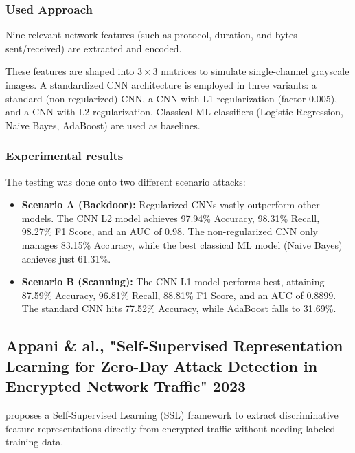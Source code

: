 \documentclass[12pt, a4paper]{report}
\begin{document}
\subsubsection{Used Approach }
Nine relevant network features (such as protocol, duration, and bytes sent/received) are extracted and encoded. 

These features are shaped into $3 \times 3$ matrices to simulate single-channel grayscale images. A standardized CNN architecture is employed in three variants: a standard (non-regularized) CNN, a CNN with L1 regularization (factor 0.005), and a CNN with L2 regularization. Classical ML classifiers (Logistic Regression, Naive Bayes, AdaBoost) are used as baselines. 

\subsubsection{Experimental results}
The testing was done onto two different scenario attacks:
\begin{itemize}

    \item \textbf{Scenario A (Backdoor):} Regularized CNNs vastly outperform other models. The CNN L2 model achieves 97.94\% Accuracy, 98.31\% Recall, 98.27\% F1 Score, and an AUC of 0.98. The non-regularized CNN only manages 83.15\% Accuracy, while the best classical ML model (Naive Bayes) achieves just 61.31\%.
    \item \textbf{Scenario B (Scanning):} The CNN L1 model performs best, attaining 87.59\% Accuracy, 96.81\% Recall, 88.81\% F1 Score, and an AUC of 0.8899. The standard CNN hits 77.52\% Accuracy, while AdaBoost falls to 31.69\%.
\end{itemize}

\subsection{Appani \& al., "Self-Supervised Representation Learning for Zero-Day Attack Detection in Encrypted Network Traffic" 2023}
\cite{appani2023selfsupervised} proposes a Self-Supervised Learning (SSL) framework to extract discriminative feature representations directly from encrypted traffic without needing labeled training data. 
\end{document}
